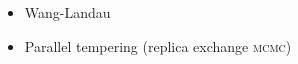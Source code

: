 \documentclass[../notebook.tex]{subfiles}
\begin{document}

\begin{itemize}
  \item Wang-Landau
  \item Parallel tempering (replica exchange \textsc{mcmc})
\end{itemize}


\end{document}
